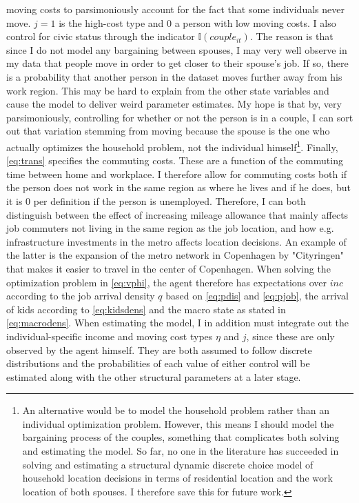 moving costs to parsimoniously account for the fact that some individuals never move. $j=1$ is the high-cost type and 0 a person with low moving costs. I also control for civic status through the indicator $\mathbb{I}{(couple_{it})}$. The reason is that since I do not model any bargaining between spouses, I may very well observe in my data that people move in order to get closer to their spouse's job. If so, there is a probability that another person in the dataset moves further away from his work region. This may be hard to explain from the other state variables and cause the model to deliver weird parameter estimates. My hope is that by, very parsimoniously, controlling for whether or not the person is in a couple, I can sort out that variation stemming from moving because the spouse is the one who actually optimizes the household problem, not the individual himself\footnote{An alternative would be to model the household problem rather than an individual optimization problem. However, this means I should model the bargaining process of the couples, something that complicates both solving and estimating the model. So far, no one in the literature has succeeded in solving and estimating a structural dynamic discrete choice model of household location decisions in terms of residential location and the work location of both spouses. I therefore save this for future work.}. Finally, \eqref{eq:trans} specifies the commuting costs. These are a function of the commuting time between home and workplace. I therefore allow for commuting costs both if the person does not work in the same region as where he lives and if he does, but it is 0 per definition if the person is unemployed. Therefore, I can both distinguish between the effect of increasing mileage allowance that mainly affects job commuters not living in the same region as the job location, and how e.g. infrastructure investments in the metro affects location decisions. An example of the latter is the expansion of the metro network in Copenhagen by "Cityringen"  that makes it easier to travel in the center of Copenhagen. When solving the optimization problem in \eqref{eq:vphi}, the agent therefore has expectations over $inc$ according to the job arrival density $q$ based on  \eqref{eq:pdis} and \eqref{eq:pjob}, the arrival of kids according to \eqref{eq:kidsdens} and the macro state as stated in \eqref{eq:macrodens}. When estimating the model, I in addition must integrate out the individual-specific income and moving cost types $\eta$ and $j$, since these are only observed by the agent himself. They are both assumed to follow discrete distributions and the probabilities of each value of either control will be estimated along with the other structural parameters at a later stage.

